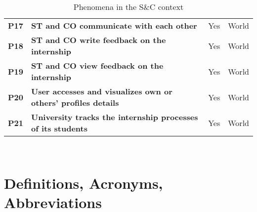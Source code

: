 \begin{table}[H]
\begin{tabular}{|c|p{24em}|c|c|}
    \small\textbf{P17} &\small \textbf{ST and CO communicate with each other} & Yes & World \T\B\\
    \small\textbf{P18} &\small \textbf{ST and CO write feedback on the internship} & Yes & World \T\B\\
    \small\textbf{P19} &\small \textbf{ST and CO view feedback on the internship} & Yes & World \B\\
    \small\textbf{P20} &\small \textbf{User accesses and visualizes own or others' profiles details} & Yes & World \T\B\\
    \small\textbf{P21} &\small \textbf{University tracks the internship processes of its students} & Yes & World \T\B\\
    \hline
    \end{tabular}
    \\[10pt]
    \caption{Phenomena in the S\&C context}\label{table:phenomena}
\end{table}

\newpage
\section{Definitions, Acronyms, Abbreviations}\label{sec:definitions}
